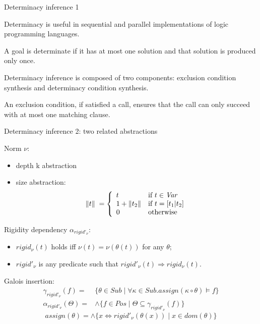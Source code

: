 \documentclass{beamer}
\def\upright{\|}
\begin{document}
\begin{frame}{Determinacy inference 1}
\vspace{\fill}

Determinacy is useful in sequential and parallel implementations
of logic programming languages.

A goal is determinate if it has at most one solution and that
solution is produced only once.

Determinacy inference is composed of two components: exclusion
condition synthesis and determinacy condition synthesis.

An exclusion condition, if satisfied a call, ensures that the call
can only succeed with at most one matching clause.

\vspace{\fill}
\end{frame}

\begin{frame}{Determinacy inference 2: two related abstractions}
\vspace{\fill}

\begin{minipage}[t]{.45\textwidth}
Norm $\nu$:
\begin{itemize}
    \item depth k abstraction
    \item size abstraction:
    \[
\upright{t}\upright \; =
\left\{\begin{array}{ll} t & \mbox{if $t\in{\it Var}$}\\
  1+ \upright{t_2}\upright & \mbox{if $t=[t_1|t_2]$}\\
  0 & \mbox{otherwise}\\
\end{array}\right.
\]
\end{itemize}
\end{minipage} \hspace{\fill}
\begin{minipage}[t]{.45\textwidth}
Rigidity dependency $\alpha_{rigid'_\nu}$:
\begin{itemize}
    \item $rigid_\nu(t)$  holds iff $\nu(t)=\nu(\theta(t))$ for any
    $\theta$;
    \item $rigid'_\nu$ is any predicate such that
    $rigid'_\nu(t)\Rightarrow rigid_\nu(t)$.
\end{itemize}

\end{minipage}

Galois insertion:
    \[ \begin{array}{rl}
\gamma_{rigid'_{\nu}}(f) = & \{ \theta \in Sub \mid \forall
\kappa \in Sub . assign(\kappa \circ \theta) \models f \} \\
\alpha_{rigid'_{\nu}}(\Theta) = & \wedge \{ f \in Pos \mid \Theta
\subseteq \gamma_{rigid'_{\nu}}(f) \} \end{array}\]
\[ assign(\theta) = \wedge \{ x \Leftrightarrow rigid'_{\nu}(\theta(x))
\mid x \in dom(\theta) \}\]

 \vspace{\fill}
\end{frame}
\end{document}
